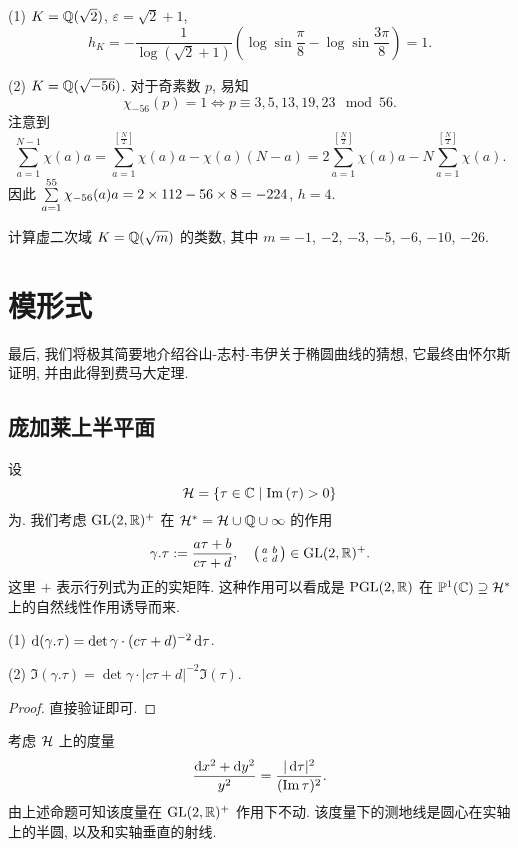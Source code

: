 \begin{example}
(1) $K={\mathbb{Q}}(\sqrt{2})$, $\varepsilon=\sqrt{2}+1$,
  \[h_K=-\frac{1}{\log(\sqrt{2}+1)}(\log\sin\frac{\pi}{8}-\log\sin\frac{3\pi}{8})=1.\]

(2) $K={\mathbb{Q}}(\sqrt{-56})$. 对于奇素数 $p$, 易知
  \[\chi_{-56}(p)=1\iff p\equiv 3,5,13,19,23\mod 56.\]
注意到
  \[\sum_{a=1}^{N-1}\chi(a)a=\sum_{a=1}^{\left[\frac N2\right]}\chi(a)a-\chi(a)(N-a)=2\sum_{a=1}^{\left[\frac N2\right]}\chi(a)a-N\sum_{a=1}^{\left[\frac N2\right]}\chi(a).\]
因此 $\sum\limits_{a=1}^{55} \chi_{-56}(a)a=2\times 112-56\times 8=-224$, $h=4$.
\end{example}

\begin{exercise}
计算虚二次域 $K={\mathbb{Q}}(\sqrt{m})$ 的类数, 其中 $m=-1$, $-2$, $-3$, $-5$, $-6$, $-10$, $-26$.
\end{exercise}



\section{模形式}
\label{sec:modular forms}

最后, 我们将极其简要地介绍谷山-志村-韦伊关于椭圆曲线的猜想, 它最终由怀尔斯证明, 并由此得到费马大定理.

\subsection{庞加莱上半平面}
设 
  \[{\mathcal{H}}=\left\{\tau\in{\mathbb{C}}\mid {\mathrm{Im}\,}(\tau)>0\right\}\]
为. 我们考虑 ${\mathrm{GL}}(2,{\mathbb{R}})^+$ 在 ${\mathcal{H}}^*={\mathcal{H}}\cup{\mathbb{Q}}\cup\infty$ 的作用
  \[\gamma.\tau:=\frac{a\tau+b}{c\tau+d},\quad\left(\begin{smallmatrix}a & b \\ c & d\end{smallmatrix}\right)\in{\mathrm{GL}}(2,{\mathbb{R}})^+.\]
这里 $+$ 表示行列式为正的实矩阵.
这种作用可以看成是 ${\mathrm{PGL}}(2,{\mathbb{R}})$ 在 ${\mathbb{P}}^1({\mathbb{C}})\supseteq {\mathcal{H}}^*$ 上的自然线性作用诱导而来.

\begin{proposition}{}{}
(1) $\mathop{}\!\mathrm{d}(\gamma.\tau)=\det\gamma\cdot(c\tau+d)^{-2}\mathop{}\!\mathrm{d} \tau$.

(2) $\Im(\gamma.\tau)=\det\gamma\cdot|c\tau+d|^{-2}\Im(\tau)$.
\end{proposition}
\begin{proof}
直接验证即可.
\end{proof}

考虑 ${\mathcal{H}}$ 上的度量
  \[\frac{\mathop{}\!\mathrm{d} x^2+\mathop{}\!\mathrm{d} y^2}{y^2}=\frac{|\mathop{}\!\mathrm{d}\tau|^2}{({\mathrm{Im}\,}\tau)^2}.\]
由上述命题可知该度量在 ${\mathrm{GL}}(2,{\mathbb{R}})^+$ 作用下不动.
该度量下的测地线是圆心在实轴上的半圆, 以及和实轴垂直的射线.

